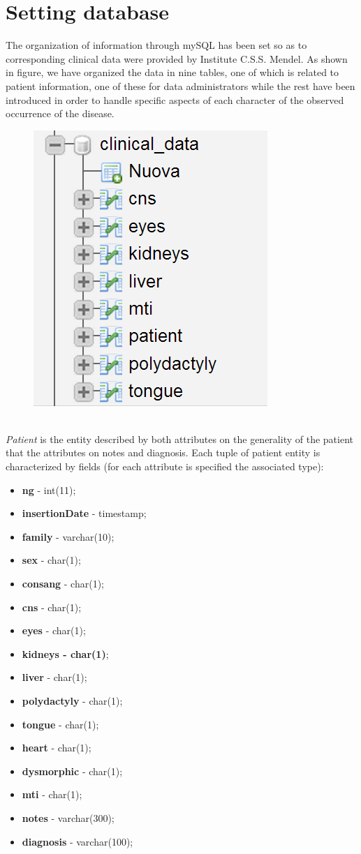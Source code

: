 \documentclass[a4paper]{report}
\begin{document}
\section{Setting database}
The organization of information through mySQL has been set so as to corresponding clinical data were provided by Institute C.S.S. Mendel. As shown in figure, we have organized the data in nine tables, one of which is related to patient information, one of these for data administrators while the rest have been introduced in order to handle specific aspects of each character of the observed occurrence of the disease. 
\begin{figure}[h]
\centering
\includegraphics[scale=.35]{db.jpg}
\end{figure}
\\
\textit{Patient} is the entity described by both attributes on the generality of the patient that the attributes on notes and diagnosis. Each tuple of patient entity is characterized by fields (for each attribute is specified the associated type):
\begin{itemize}
      	\item \textbf{ng}  -  int(11);
	\item \textbf{insertionDate} - timestamp;
	\item \textbf{family} - varchar(10);
	\item \textbf{sex} - char(1);
	\item \textbf{consang} - char(1);
	\item \textbf{cns} - char(1);
	\item \textbf{eyes} - char(1);
	\item \textbf{kidneys - char(1)};
	\item \textbf{liver} - char(1);
	\item \textbf{polydactyly} - char(1);
	\item \textbf{tongue} - char(1);
	\item \textbf{heart} - char(1);
	\item \textbf{dysmorphic} - char(1);
	\item \textbf{mti} - char(1);
	\item \textbf{notes} - varchar(300);
	\item \textbf{diagnosis}  - varchar(100);
\end{itemize}
\end{document}
